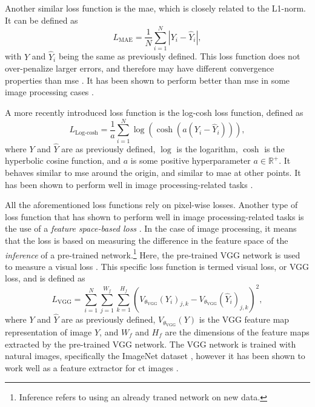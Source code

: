 Another similar loss function is the \gls{mae}, which is closely related to the L1-norm. It can be defined as
\begin{equation}
    \label{eq:lossmae}
    L_{\text{MAE}} = \frac{1}{N} \sum_{i=1}^N |Y_i - \hat{Y}_i|,
\end{equation}
with $Y$ and $\hat{Y}_i$ being the same as previously defined. This loss function does not over-penalize larger errors, and therefore may have different convergence properties than \gls{mse} \cite{7797130}. It has been shown to perform better than \gls{mse} in some image processing cases \cite{7797130,10.1002/mp.13713}. 

A more recently introduced loss function is the log-cosh loss function, defined as \cite{chen2019log}
\begin{equation}
    \label{eq:losslogcosh}
    L_{\text{Log-cosh}} = \frac{1}{a} \sum_{i=1}^N \log ( \cosh ( a ( Y_i - \hat{Y}_i))),
\end{equation}
where $Y$ and $\hat{Y}$ are as previously defined, $\log$ is the logarithm, $\cosh$ is the hyperbolic cosine function, and $a$ is some positive hyperparameter $a \in \mathbb{R}^+$. It behaves similar to \gls{mse} around the origin, and similar to \gls{mae} at other points. It has been shown to perform well in image processing-related tasks \cite{7797130}.

All the aforementioned loss functions rely on pixel-wise losses. Another type of loss function that has shown to perform well in image processing-related tasks is the use of a \textit{feature space-based loss} \cite{vggloss}. In the case of image processing, it means that the loss is based on measuring the difference in the feature space of the \textit{inference} of a pre-trained network.\footnote{Inference refers to using an already traned network on new data. } Here, the pre-trained VGG network is used to measure a visual loss \cite{simonyan2015deep}. This specific loss function is termed visual loss, or VGG loss, and is defined as \cite{vggloss,liu2020tomogan}
\begin{equation}
    \label{eq:lossvgg}
    L_{\text{VGG}} = \sum_{i=1}^{N} \sum_{j=1}^{W_f} \sum_{k=1}^{H_f} \left(V_{\theta_{\text{VGG}}} (Y_i)_{j,k} - V_{\theta_{\text{VGG}}} (\hat{Y}_i)_{j,k} \right)^2,
\end{equation}
where $Y$ and $\hat{Y}$ are as previously defined, $V_{\theta_{\text{VGG}}}(Y)$ is the VGG feature map representation of image $Y$, and $W_f$ and $H_f$ are the dimensions of the feature maps extracted by the pre-trained VGG network. The VGG network is trained with natural images, specifically the ImageNet dataset \cite{deng2009imagenet}, however it has been shown to work well as a feature extractor for \gls{ct} images \cite{8340157}. 

